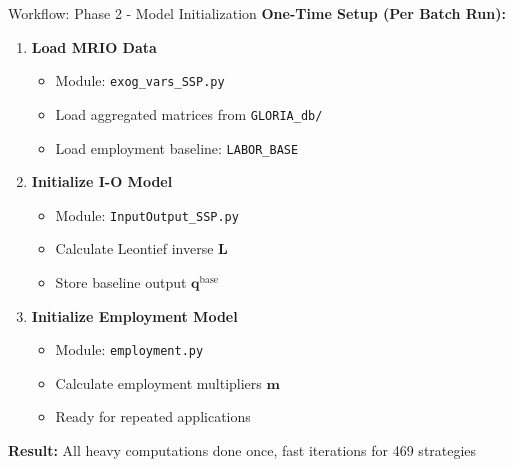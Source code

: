 \documentclass[10pt]{beamer}
\begin{document}
\begin{frame}{Workflow: Phase 2 - Model Initialization}
\textbf{One-Time Setup (Per Batch Run):}

\vspace{0.3cm}

\begin{enumerate}
    \item \textbf{Load MRIO Data}
    \begin{itemize}
        \item Module: \texttt{exog\_vars\_SSP.py}
        \item Load aggregated matrices from \texttt{GLORIA\_db/}
        \item Load employment baseline: \texttt{LABOR\_BASE}
    \end{itemize}

    \vspace{0.2cm}

    \item \textbf{Initialize I-O Model}
    \begin{itemize}
        \item Module: \texttt{InputOutput\_SSP.py}
        \item Calculate Leontief inverse $\mathbf{L}$
        \item Store baseline output $\mathbf{q}^{\text{base}}$
    \end{itemize}

    \vspace{0.2cm}

    \item \textbf{Initialize Employment Model}
    \begin{itemize}
        \item Module: \texttt{employment.py}
        \item Calculate employment multipliers $\mathbf{m}$
        \item Ready for repeated applications
    \end{itemize}
\end{enumerate}

\vspace{0.3cm}

\textbf{Result:} All heavy computations done once, fast iterations for 469 strategies
\end{frame}
\end{document}
